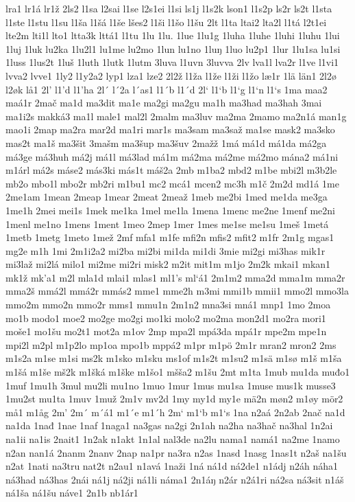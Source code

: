 lra1
lr1á
lr1ž
2ls2
l1sa
l2sai
l1se
l2s1ei
l1si
ls1j
l1s2k
lson1
l1s2p
ls2r
ls2t
l1sta
l1ste
l1stu
l1su
l1ša
l1šá
l1še
lšes2
l1ši
l1šo
l1šu
2lt
l1ta
ltai2
lta2l
l1tá
l2t1ei
lte2m
lti1l
lto1
ltta3k
lttá1
l1tu
1lu
1lu.
1lue
1lu1g
1luha
1luhe
1luhi
1luhu
1lui
1luj
1luk
lu2ka
1lu2l1
lu1me
lu2mo
1lun
lu1no
1luŋ
1luo
lu2p1
1lur
1lu1sa
lu1si
1luss
1lus2t
1luš
1luth
1lutk
1lutm
3luva
l1uvn
3luvva
2lv
lva1l
lva2r
l1ve
l1vi1
lvva2
lvve1
1ly2
l1y2a2
lyp1
lza1
lze2
2l2ž
l1ža
l1že
l1ži
l1žo
læ1r
1lä
län1
2l2ø
l2øk
lå1
2l'
l1'd
l1'ha
2l´
l´2a
l´as1
l1´b
l1´d
2l`
l1`b
l1`g
l1`n
l1`s
1ma
maa2
maá1r
2mač
ma1d
ma3dit
ma1e
ma2gi
ma2gu
ma1h
ma3had
ma3hah
3mai
ma1i2s
makká3
ma1l
male1
mal2l
2malm
ma3luv
ma2ma
2mamo
ma2n1á
man1g
mao1i
2map
ma2ra
mar2d
ma1ri
mar1s
ma3sam
ma3saž
ma1se
mask2
ma3sko
mas2t
ma1š
ma3šit
3mašm
ma3šup
ma3šuv
2mažž
1má
má1d
má1da
má2ga
má3ge
má3huh
má2j
má1l
má3lad
má1m
má2ma
má2me
má2mo
mána2
má1ni
m1árl
má2s
máse2
más3ki
más1t
máš2a
2mb
m1ba2
mbd2
m1be
mbi2l
m3b2le
mb2o
mbo1l
mbo2r
mb2ri
m1bu1
mc2
mcá1
mcen2
mc3h
m1č
2m2d
md1á
1me
2me1am
1mean
2meap
1mear
2meat
2meaž
1meb
me2bi
1med
me1da
me3ga
1me1h
2mei
mei1s
1mek
me1ka
1mel
me1la
1mena
1menc
me2ne
1menf
me2ni
1menl
me1no
1mens
1ment
1meo
2mep
1mer
1mes
me1se
me1su
1meš
1metá
1metb
1metg
1meto
1mež
2mf
mfa1
m1fe
mfi2n
mfis2
mfit2
m1fr
2m1g
mgas1
mg2e
m1h
1mi
2m1i2a2
mi2ba
mi2bi
mi1da
mi1di
3mie
mi2gi
mi3has
mik1r
mi3laž
mi2lá
milo1
mi2me
mi2ri
misk2
m2it
mit1m
m1jo
2m2k
mkai1
mkan1
mk1ž
mk'a1
m2l
mla1d
mlai1
mlas1
ml1's
ml`á1
2m1m2
mma2d
mma1m
mma2r
mma2š
mmá2l
mmá2r
mmás2
mme1
mme2h
m3mi
mmi1b
mmii1
mmo2l
mmo3la
mmo2m
mmo2n
mmo2r
mms1
mmu1n
2m1n2
mna3si
mná1
mnp1
1mo
2moa
mo1b
modo1
moe2
mo2ge
mo2gi
mo1ki
molo2
mo2ma
mon2d1
mo2ra
mori1
moše1
mo1šu
mo2t1
mot2a
m1ov
2mp
mpa2l
mpá3da
mpá1r
mpe2m
mpe1n
mpi2l
m2pl
m1p2lo
mp1oa
mpo1b
mppá2
m1pr
m1pö
2m1r
mran2
mron2
2ms
m1s2a
m1se
m1si
ms2k
m1sko
m1sku
ms1of
m1s2t
m1su2
m1sä
m1sø
m1š
m1ša
m1šá
m1še
mš2k
m1šká
m1ške
m1šo1
mšša2
m1šu
2mt
m1ta
1mub
mu1da
muđo1
1muf
1mu1h
3mul
mu2li
mu1no
1muo
1mur
1mus
mu1sa
1muse
mus1k
musse3
1mu2st
mu1ta
1muv
1muž
2m1v
mv2d
1my
my1d
my1e
mä2n
møn2
m1øy
mör2
må1
m1åg
2m'
2m´
m´á1
m1´e
m1´h
2m`
m1`b
m1`s
1na
n2aá
2n2ab
2nač
na1d
na1da
1nađ
1nae
1naf
1naga1
na3gas
na2gi
2n1ah
na2ha
na3hač
na3hal
1n2ai
na1ii
na1is
2nait1
1n2ak
n1akt
1n1al
nal3de
na2lu
nama1
namá1
na2me
1namo
n2an
nan1á
2nanm
2nanv
2nap
na1pr
na3ra
n2as
1nasd
1nasg
1nas1t
n2aš
na1šu
n2at
1nati
na3tru
nat2t
n2au1
n1avá
1naži
1ná
ná1d
ná2de1
n1ádj
n2áh
náha1
ná3had
ná3has
2nái
ná1j
ná2ji
ná1li
náma1
2n1áŋ
n2ár
n2á1ri
ná2sa
ná3sit
n1áš
ná1ša
ná1šu
náve1
2n1b
nb1ár1
